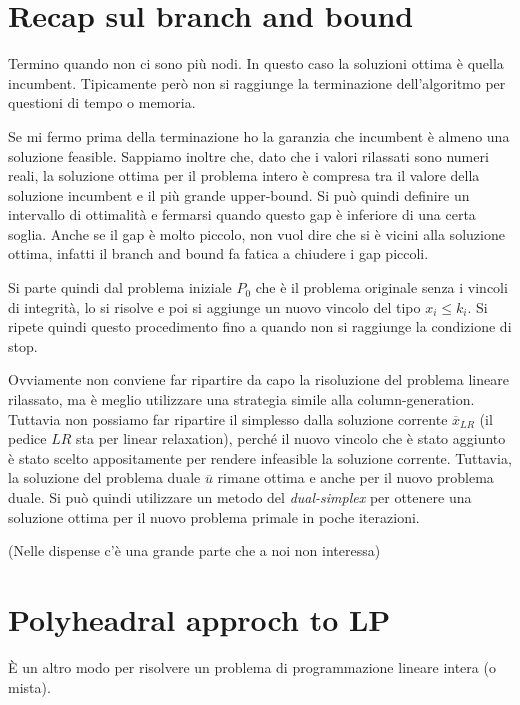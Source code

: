 
\section{Recap sul branch and bound}

Termino quando non ci sono più nodi. In questo caso la soluzioni ottima è quella incumbent. Tipicamente però non si raggiunge la terminazione dell'algoritmo per questioni di tempo o memoria.

Se mi fermo prima della terminazione ho la garanzia che incumbent è almeno una soluzione feasible. Sappiamo inoltre che, dato che i valori rilassati sono numeri reali, la soluzione ottima per il problema intero è compresa tra il valore della soluzione incumbent e il più grande upper-bound.
Si può quindi definire un intervallo di ottimalità e fermarsi quando questo gap è inferiore di una certa soglia.
Anche se il gap è molto piccolo, non vuol dire che si è vicini alla soluzione ottima, infatti il branch and bound fa fatica a chiudere i gap piccoli.

Si parte quindi dal problema iniziale $P_0$ che è il problema originale senza i vincoli di integrità, lo si risolve e poi si aggiunge un nuovo vincolo del tipo $x_i \leq k_i$. Si ripete quindi questo procedimento fino a quando non si raggiunge la condizione di stop.

Ovviamente non conviene far ripartire da capo la risoluzione del problema lineare rilassato, ma è meglio utilizzare una strategia simile alla column-generation.
Tuttavia non possiamo far ripartire il simplesso dalla soluzione corrente $\overline{x}_{LR}$  (il pedice $LR$ sta per linear relaxation), perché il nuovo vincolo che è stato aggiunto è stato scelto appositamente per rendere infeasible la soluzione corrente.
Tuttavia, la soluzione del problema duale $\overline{u}$ rimane ottima e anche per il nuovo problema duale. Si può quindi utilizzare un metodo del \textit{dual-simplex} per ottenere una soluzione ottima per il nuovo problema primale in poche iterazioni.

(Nelle dispense c'è una grande parte che a noi non interessa)


\section{Polyheadral approch to LP}

\`E un altro modo per risolvere un problema di programmazione lineare intera (o mista).

